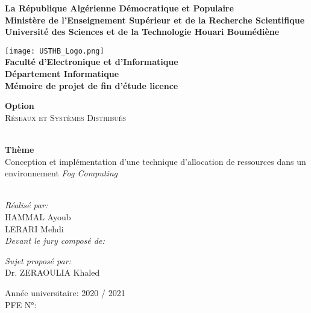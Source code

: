 \begin{titlepage}
\begin{center}

\textbf{
La République Algérienne Démocratique et Populaire\\[0.1cm]
Ministère de l'Enseignement Supérieur et de la Recherche Scientifique\\[0.1cm]
Université des Sciences et de la Technologie Houari Boumédiène\\[0.5cm]}

\texttt{[image: USTHB\_Logo.png]}\\[0.7cm]

{\Large \textbf{
Faculté d’Electronique et d’Informatique\\[0,1cm]
Département Informatique\\[0,1cm]
Mémoire de projet de fin d'étude licence\\[0.5cm]}}

{\Large \textbf{Option\\[0.5cm]}
\textsc{Réseaux et Systèmes Distribués\\}}

\HRule \\[0.4cm]
{\Huge 
{\bfseries Thème}\\
Conception et implémentation d'une
technique d'allocation de ressources
dans un environnement \emph{Fog Computing}\\[0.4cm]}
\HRule \\[0.7cm]

\normalsize
\begin{minipage}[t]{0.4\textwidth}
\begin{flushleft}
\large
\emph{Réalisé par:}\\
\textsc{HAMMAL} Ayoub\\
\textsc{LERARI} Mehdi\\[0.7cm]
\emph{Devant le jury composé de:}\\
\end{flushleft}
\end{minipage}
%
\begin{minipage}[t]{0.4\textwidth}
\begin{flushright} 
\large
\emph{Sujet proposé par:}\\
Dr. \textsc{ZERAOULIA} Khaled
\end{flushright}
\end{minipage}

\vfill

{\large Année universitaire: 2020 / 2021}\\
{\large PFE N°: }

\end{center}
\end{titlepage}